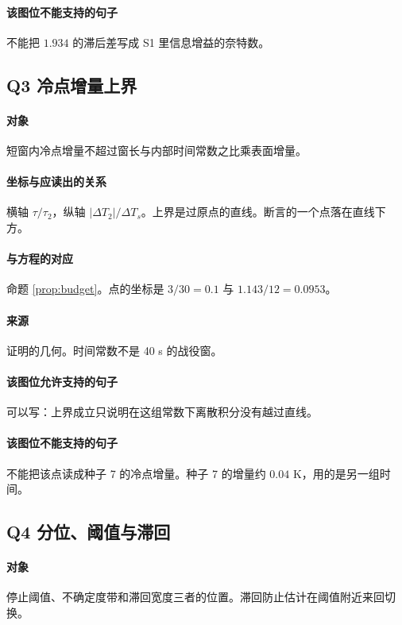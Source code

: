\paragraph{该图位不能支持的句子}
不能把 $1.934$ 的滞后差写成 S1 里信息增益的奈特数。

\subsection{Q3 冷点增量上界}
\paragraph{对象}
短窗内冷点增量不超过窗长与内部时间常数之比乘表面增量。

\paragraph{坐标与应读出的关系}
横轴 $\tau/\tau_2$，纵轴 $|\Delta T_2|/\Delta T_s$。上界是过原点的直线。断言的一个点落在直线下方。

\paragraph{与方程的对应}
命题 \ref{prop:budget}。点的坐标是 $3/30=0.1$ 与 $1.143/12=0.0953$。

\paragraph{来源}
证明的几何。时间常数不是 40 s 的战役窗。

\paragraph{该图位允许支持的句子}
可以写：上界成立只说明在这组常数下离散积分没有越过直线。

\paragraph{该图位不能支持的句子}
不能把该点读成种子 7 的冷点增量。种子 7 的增量约 $0.04$ K，用的是另一组时间。

\subsection{Q4 分位、阈值与滞回}
\paragraph{对象}
停止阈值、不确定度带和滞回宽度三者的位置。滞回防止估计在阈值附近来回切换。

